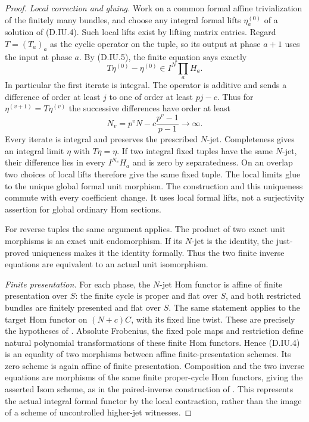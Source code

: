 \begin{proof}
\emph{Local correction and gluing.}
Work on a common formal affine trivialization of the finitely
many bundles, and choose any integral formal lifts
$\eta_a^{(0)}$ of a solution of (D.IU.4). Such local lifts
exist by lifting matrix entries. Regard $T=(T_a)_a$ as the
cyclic operator on the tuple, so its output at phase $a+1$
uses the input at phase $a$. By (D.IU.5), the finite equation
says exactly
\[
                T\eta^{(0)}-\eta^{(0)}\in I^N\prod_a H_a.
                                                        \tag{D.IU.7}
\]
In particular the first iterate is integral. The operator
is additive and sends a difference of order at least $j$
to one of order at least $pj-c$. Thus for
$\eta^{(v+1)}=T\eta^{(v)}$ the successive differences
have order at least
\[
       N_v=p^vN-c\frac{p^v-1}{p-1}\longrightarrow\infty.
                                                        \tag{D.IU.8}
\]
Every iterate is integral and preserves the prescribed
$N$-jet. Completeness gives an integral limit $\eta$ with
$T\eta=\eta$. If two integral fixed tuples have the same
$N$-jet, their difference lies in every $I^{N_v}H_a$ and
is zero by separatedness. On an overlap two choices of
local lifts therefore give the same fixed tuple. The local
limits glue to the unique global formal unit morphism.
The construction and this uniqueness commute with every
coefficient change. It uses local formal lifts, not a
surjectivity assertion for global ordinary Hom sections.

For reverse tuples the same argument applies. The product
of two exact unit morphisms is an exact unit endomorphism.
If its $N$-jet is the identity, the just-proved uniqueness
makes it the identity formally. Thus the two finite inverse
equations are equivalent to an actual unit isomorphism.

\emph{Finite presentation.}
For each phase, the $N$-jet Hom functor is affine of finite
presentation over $S$: the finite cycle is proper and flat
over $S$, and both restricted bundles are finitely presented
and flat over $S$. The same statement applies to the target
Hom functor on $(N+c)C$, with its fixed line twist. These
are precisely the hypotheses of
\citet[Proposition 99.3.10, Tag 08K6]{StacksIntrinsicUnitHomD}.
Absolute Frobenius, the fixed pole maps and restriction
define natural polynomial transformations of these finite
Hom functors. Hence (D.IU.4) is an equality of two morphisms
between affine finite-presentation schemes. Its zero scheme
is again affine of finite presentation. Composition and the
two inverse equations are morphisms of the same finite
proper-cycle Hom functors, giving the asserted Isom scheme,
as in the paired-inverse construction of
\citet[Proposition 99.4.3, Tag 08K9]{StacksIntrinsicUnitHomD}.
This represents the actual integral formal functor by the
local contraction, rather than the image of a scheme of
uncontrolled higher-jet witnesses.


\end{proof}
